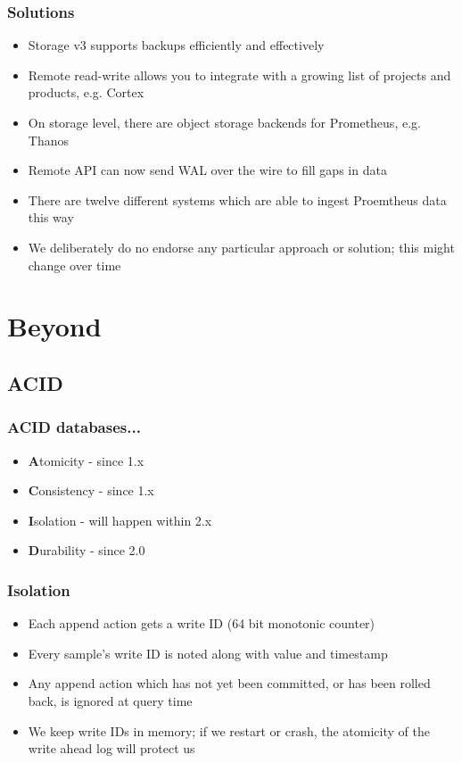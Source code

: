 \documentclass[t]{beamer}
\begin{document}
\begin{frame}
	\frametitle{Solutions}
	\begin{itemize}
		\item Storage v3 supports backups efficiently and effectively
		\item Remote read-write allows you to integrate with a growing list of projects and products, e.g. Cortex
		\item On storage level, there are object storage backends for Prometheus, e.g. Thanos
		\item Remote API can now send WAL over the wire to fill gaps in data
		\item There are twelve different systems which are able to ingest Proemtheus data this way
		\item We deliberately do no endorse any particular approach or solution; this might change over time
	\end{itemize}
\end{frame}

\section{Beyond}

\subsection{ACID}

\begin{frame}
	\frametitle{ACID databases...}
	\begin{itemize}
		\item \textbf{A}tomicity - since 1.x
		\item \textbf{C}onsistency - since 1.x
		\item \textbf{I}solation - will happen within 2.x
		\item \textbf{D}urability - since 2.0
	\end{itemize}
\end{frame}

\begin{frame}
	\frametitle{Isolation}
	\begin{itemize}
		\item Each append action gets a write ID (64 bit monotonic counter)
		\item Every sample's write ID is noted along with value and timestamp
		\item Any append action which has not yet been committed, or has been rolled back, is ignored at query time
		\item We keep write IDs in memory; if we restart or crash, the atomicity of the write ahead log will protect us
	\end{itemize}
\end{frame}
\end{document}
